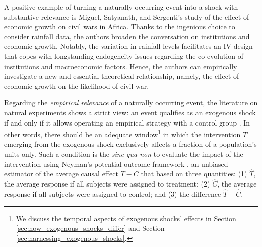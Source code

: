 \documentclass[11pt]{article}
\begin{document}
\begin{refsection}
A positive example of turning a naturally occurring event into a shock with substantive relevance is Miguel, Satyanath, and Sergenti's \autocite*{miguel_et_al_2004} study of the effect of economic growth on civil wars in Africa. Thanks to the ingenious choice to consider rainfall data, the authors broaden the conversation on institutions and economic growth. Notably, the variation in rainfall levels facilitates an IV design that copes with longstanding endogeneity issues regarding the co-evolution of institutions and macroeconomic factors. Hence, the authors can empirically investigate a new and essential theoretical relationship, namely, the effect of economic growth on the likelihood of civil war. 

Regarding the \textit{empirical relevance} of a naturally occurring event, the literature on natural experiments shows a strict view: an event qualifies as an exogenous shock if and only if it allows operating an empirical strategy with a control group \autocite[][]{cook_et_al_2002}. In other words, there should be an adequate window\footnote{We discuss the temporal aspects of exogenous shocks' effects in Section \ref{sec:how_exogenous_shocks_differ} and Section \ref{sec:harnessing_exogenous_shocks}.} in which the intervention $T$ emerging from the exogenous shock exclusively affects a fraction of a population's units only.  Such a condition is the \textit{sine qua non} to evaluate the impact of the intervention using Neyman's potential outcome framework \autocite*{neyman_et_al_1923}, an unbiased estimator of the average causal effect $T - C$ that based on three quantities: (1) $\widehat{T}$, the average response if all subjects were assigned to treatment; (2) $\widehat{C}$, the average response if all subjects were assigned to control; and (3) the difference $\hat{T} - \widehat{C}$.


\end{refsection}
\end{document}
